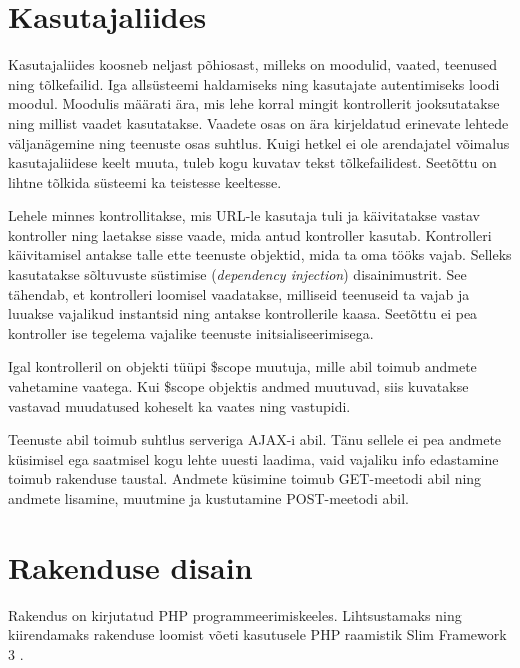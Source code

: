 \documentclass[a4paper,12pt]{article} %
\begin{document}
\section{Kasutajaliides}
Kasutajaliides koosneb neljast põhiosast, milleks on moodulid, vaated, teenused ning tõlkefailid. Iga allsüsteemi haldamiseks ning kasutajate autentimiseks loodi moodul. Moodulis määrati ära, mis lehe korral mingit kontrollerit jooksutatakse ning millist vaadet kasutatakse. Vaadete osas on ära kirjeldatud erinevate lehtede väljanägemine ning teenuste osas suhtlus. Kuigi hetkel ei ole arendajatel võimalus kasutajaliidese keelt muuta, tuleb kogu kuvatav tekst tõlkefailidest. Seetõttu on lihtne tõlkida süsteemi ka teistesse keeltesse.\par
Lehele minnes kontrollitakse, mis URL-le kasutaja tuli ja käivitatakse vastav kontroller ning laetakse sisse vaade, mida antud kontroller kasutab. Kontrolleri käivitamisel antakse talle ette teenuste objektid, mida ta oma tööks vajab. Selleks kasutatakse sõltuvuste süstimise (\textit{dependency injection}) disainimustrit. See tähendab, et kontrolleri loomisel vaadatakse, milliseid teenuseid ta vajab ja luuakse vajalikud instantsid ning antakse kontrollerile kaasa. Seetõttu ei pea kontroller ise tegelema vajalike teenuste initsialiseerimisega.\par
Igal kontrolleril on objekti tüüpi \$scope muutuja, mille abil toimub andmete vahetamine vaatega. Kui \$scope objektis andmed muutuvad, siis kuvatakse vastavad muudatused koheselt ka vaates ning vastupidi.\par
Teenuste abil toimub suhtlus serveriga AJAX-i abil. Tänu sellele ei pea andmete küsimisel ega saatmisel kogu lehte uuesti laadima, vaid vajaliku info edastamine toimub rakenduse taustal. Andmete küsimine toimub GET-meetodi abil ning andmete lisamine, muutmine ja kustutamine POST-meetodi abil.

\section{Rakenduse disain}
Rakendus on kirjutatud PHP programmeerimiskeeles. Lihtsustamaks ning kiirendamaks rakenduse loomist võeti kasutusele PHP raamistik Slim Framework 3 \cite{SlimFW}.
\end{document}
